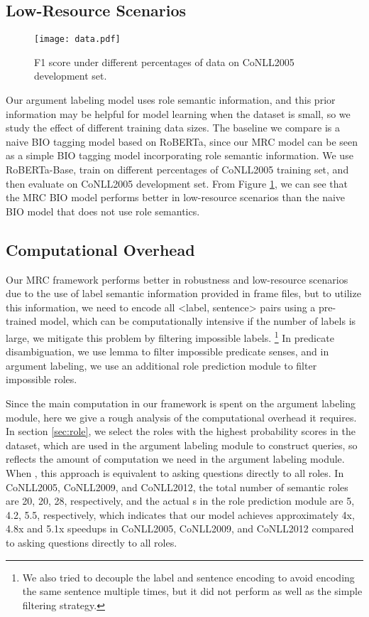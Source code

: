 \documentclass[11pt]{article}
\begin{document}
\subsection{Low-Resource Scenarios}
\begin{figure}
    \centering
    \texttt{[image: data.pdf]}
    \caption{F1 score under different percentages of data on CoNLL2005 development set.}
    \label{fig:data}
\end{figure}
Our argument labeling model uses role semantic information, and this prior information may be helpful for model learning when the dataset is small, so we study the effect of different training data sizes. The baseline we compare is a naive BIO tagging model based on RoBERTa, since our MRC model can be seen as a simple BIO tagging model incorporating role semantic information. We use RoBERTa-Base, train on different percentages of CoNLL2005 training set, and then evaluate on CoNLL2005 development set. From Figure \ref{fig:data}, we can see that the MRC BIO model performs better in low-resource scenarios than the naive BIO model that does not use role semantics.

\subsection{Computational Overhead}
Our MRC framework performs better in robustness and low-resource scenarios due to the use of label semantic information provided in frame files, but to utilize this information, we need to encode all <label, sentence> pairs using a pre-trained model, which can be computationally intensive if the number of labels is large, we mitigate this problem by filtering impossible labels.
\footnote{We also tried to decouple the label and sentence encoding to avoid encoding the same sentence multiple times, but it did not perform as well as the simple filtering strategy.}
In predicate disambiguation, we use lemma to filter impossible predicate senses, and in argument labeling, we use an additional role prediction module to filter impossible roles. 
\par
Since the main computation in our framework is spent on the argument labeling module, here we give a rough analysis of the computational overhead it requires.
In section \ref{sec:role}, we select the  roles with the highest probability scores in the dataset, which are used in the argument labeling module to construct queries, so  reflects the amount of computation we need in the argument labeling module. When , this approach is equivalent to asking questions directly to all roles. In CoNLL2005, CoNLL2009, and CoNLL2012, the total number of semantic roles are 20, 20, 28, respectively, and the actual s in the role prediction module are 5, 4.2, 5.5, respectively, 
which indicates that our model achieves approximately 4x, 4.8x and 5.1x speedups in CoNLL2005, CoNLL2009, and CoNLL2012 compared to asking questions directly to all roles.
\end{document}

